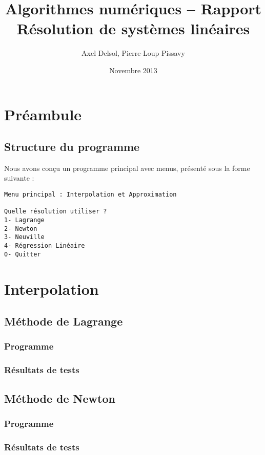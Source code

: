 \documentclass{report}
\title{Algorithmes numériques -- Rapport \\ \vspace{0.5cm}Résolution de systèmes linéaires}
\author{Axel Delsol, Pierre-Loup Pissavy}
\date{Novembre 2013}
\begin{document}
  \maketitle
  \tableofcontents

  \chapter{Préambule}
  	\section{Structure du programme}
		Nous avons conçu un programme principal avec menus, présenté sous la forme suivante :
		\begin{lstlisting}[style=apercu, name=Menu Principal]
Menu principal : Interpolation et Approximation

Quelle résolution utiliser ?
1- Lagrange
2- Newton
3- Neuville
4- Régression Linéaire
0- Quitter
		\end{lstlisting}
  \chapter{Interpolation}
	\section{Méthode de Lagrange}
		\subsection{Programme}
        
		\subsection{Résultats de tests}
			\renewcommand{\arraystretch}{2}
			\renewcommand{\arraystretch}{1}
	\section{Méthode de Newton}
        
		\subsection{Programme}
		\subsection{Résultats de tests}
			\renewcommand{\arraystretch}{2}
			\renewcommand{\arraystretch}{1}
\end{document}
